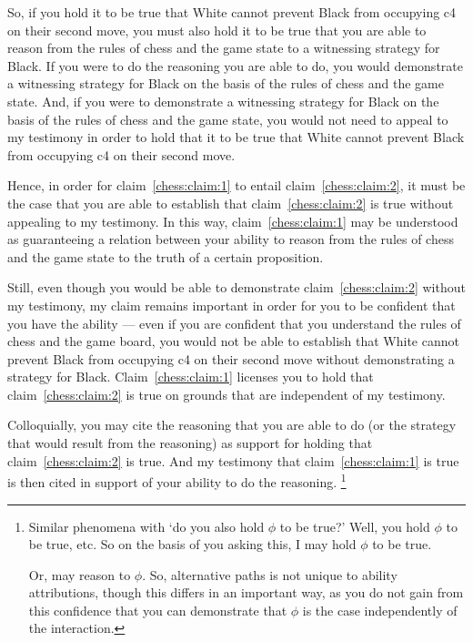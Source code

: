\documentclass[10pt]{article}
\begin{document}
So, if you hold it to be true that White cannot prevent Black from occupying c4 on their second move, you must also hold it to be true that you are able to reason from the rules of chess and the game state to a witnessing strategy for Black.
If you were to do the reasoning you are able to do, you would demonstrate a witnessing strategy for Black on the basis of the rules of chess and the game state.
And, if you were to demonstrate a witnessing strategy for Black on the basis of the rules of chess and the game state, you would not need to appeal to my testimony in order to hold that it to be true that White cannot prevent Black from occupying c4 on their second move.

Hence, in order for claim~\ref{chess:claim:1} to entail claim~\ref{chess:claim:2}, it must be the case that you are able to establish that claim~\ref{chess:claim:2} is true without appealing to my testimony.
In this way, claim~\ref{chess:claim:1} may be understood as guaranteeing a relation between your ability to reason from the rules of chess and the game state to the truth of a certain proposition.

Still, even though you would be able to demonstrate claim~\ref{chess:claim:2} without my testimony, my claim remains important in order for you to be confident that you have the ability --- even if you are confident that you understand the rules of chess and the game board, you would not be able to establish that White cannot prevent Black from occupying c4 on their second move without demonstrating a strategy for Black.
Claim~\ref{chess:claim:1} licenses you to hold that claim~\ref{chess:claim:2} is true on grounds that are independent of my testimony.

Colloquially, you may cite the reasoning that you are able to do (or the strategy that would result from the reasoning) as support for holding that claim~\ref{chess:claim:2} is true.
And my testimony that claim~\ref{chess:claim:1} is true is then cited in support of your ability to do the reasoning.\nolinebreak
\footnote{
  Similar phenomena with `do you also hold \(\phi\) to be true?'
  Well, you hold \(\phi\) to be true, etc.
  So on the basis of you asking this, I may hold \(\phi\) to be true.

  Or, may reason to \(\phi\).
  So, alternative paths is not unique to ability attributions, though this differs in an important way, as you do not gain from this confidence that you can demonstrate that \(\phi\) is the case independently of the interaction.
}
\end{document}
